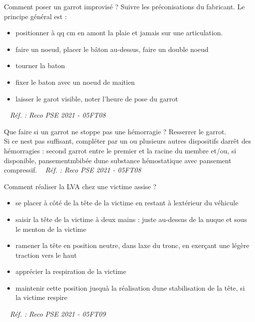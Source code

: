 \documentclass[grid,avery5371,landscape]{flashcards}
\makeatletter
\newcounter{nocarte}
\newcommand{\categ}[1]{%
  \def\@categ{#1}%
  \setcounter{nocarte}{0}%
}
\newcommand{\source}[1]{%
  \medskip
  \itshape%
   ~ \hfill Réf. : #1}
\makeatother
\begin{document}
\color[HTML]{003273}
\categ{PSE}
\begin{flashcard}[geste]{
 Comment poser un garrot improvisé ?   }
  Suivre les préconisations du fabricant. Le principe général est : \begin{itemize} 
\item positionner à qq cm en amont la plaie et jamais sur une articulation.
\item faire un noeud, placer le bâton au-dessus, faire un double noeud
\item tourner la baton
\item fixer le baton avec un noeud de maitien
\item laisser le garot visible, noter l'heure de pose du garrot  \end{itemize} 
  \source{Reco PSE 2021 - 05FT08}
\end{flashcard}


\color[HTML]{003273}
\categ{PSE}
\begin{flashcard}[CAT]{
 Que faire si un garrot ne stoppe pas une hémorragie ?   }
  Resserrer le garrot. \\
Si ce nest pas suffisant, compléter par un ou plusieurs autres dispositifs darrêt des hémorragies : second garrot entre le premier et la racine du membre et/ou, si disponible, pansementmbibée dune
substance hémostatique avec pansement compressif.
  \source{Reco PSE 2021 - 05FT08}
\end{flashcard}


\color[HTML]{003273}
\categ{PSE}
\begin{flashcard}[geste]{
 Comment réaliser la LVA chez une victime assise ?   }
  \begin{itemize}
\item se placer à côté de la tête de la victime en restant à lextérieur du véhicule 
\item  saisir la tête de la victime à deux mains : juste au-dessus de la nuque et sous le menton de la victime
\item  ramener la tête en position neutre, dans laxe du tronc, en exerçant une légère traction vers le haut 
\item apprécier la respiration de la victime 
\item maintenir cette position jusquà la réalisation dune stabilisation de la tête, si la victime respire
\end{itemize}
  \source{Reco PSE 2021 - 05FT09}
\end{flashcard}
\end{document}
